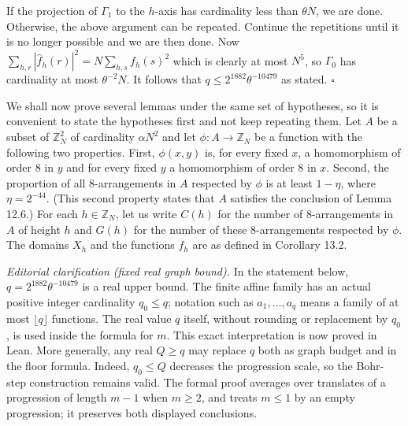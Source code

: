 \documentclass[10pt]{article}
\begin{document}
If the projection of $\Gamma_{1}$ to the $h$-axis has cardinality less than $\theta N$, we are done. Otherwise, the above argument can be repeated. Continue the repetitions until it is no longer possible and we are then done. Now $\sum_{h, r}\left|\hat{f}_{h}(r)\right|^{2}=N \sum_{h, s} f_{h}(s)^{2}$ which is clearly at most $N^{5}$, so $\Gamma_{0}$ has cardinality at most $\theta^{-2} N$. It follows that $q \leqslant 2^{1882} \theta^{-10479}$ as stated. \(\square\)

We shall now prove several lemmas under the same set of hypotheses, so it is convenient to state the hypotheses first and not keep repeating them. Let $A$ be a subset of $\mathbb{Z}_{N}^{2}$ of cardinality $\alpha N^{2}$ and let $\phi: A \rightarrow \mathbb{Z}_{N}$ be a function with the following two properties. First, $\phi(x, y)$ is, for every fixed $x$, a homomorphism of order 8 in $y$ and for every fixed $y$ a homomorphism of order 8 in $x$. Second, the proportion of all 8-arrangements in $A$ respected by $\phi$ is at least $1-\eta$, where $\eta=2^{-44}$. (This second property states that $A$ satisfies the conclusion of Lemma 12.6.) For each $h \in \mathbb{Z}_{N}$, let us write $C(h)$ for the number of 8-arrangements in $A$ of height $h$ and $G(h)$ for the number of these 8-arrangements respected by $\phi$. The domains $X_{h}$ and the functions $f_{h}$ are as defined in Corollary 13.2.

\textit{Editorial clarification (fixed real graph bound).}
In the statement below, $q=2^{1882}\theta^{-10479}$ is a real upper bound. The finite affine family has an actual positive integer cardinality $q_0\leqslant q$; notation such as $a_1,\ldots,a_q$ means a family of at most $\lfloor q\rfloor$ functions. The real value $q$ itself, without rounding or replacement by $q_0$, is used inside the formula for $m$. This exact interpretation is now proved in Lean. More generally, any real $Q\geqslant q$ may replace $q$ both as graph budget and in the floor formula. Indeed, $q_0\leqslant Q$ decreases the progression scale, so the Bohr-step construction remains valid. The formal proof averages over translates of a progression of length $m-1$ when $m\geqslant2$, and treats $m\leqslant1$ by an empty progression; it preserves both displayed conclusions.
\end{document}
